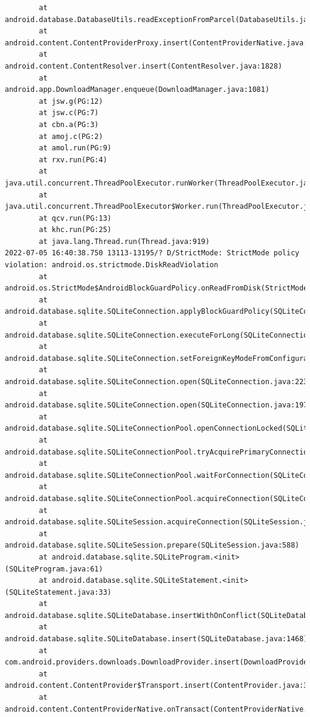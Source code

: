\documentclass[a4paper,12pt]{book}
\begin{document}
\begin{lstlisting}
        at android.database.DatabaseUtils.readExceptionFromParcel(DatabaseUtils.java:137)
        at android.content.ContentProviderProxy.insert(ContentProviderNative.java:481)
        at android.content.ContentResolver.insert(ContentResolver.java:1828)
        at android.app.DownloadManager.enqueue(DownloadManager.java:1081)
        at jsw.g(PG:12)
        at jsw.c(PG:7)
        at cbn.a(PG:3)
        at amoj.c(PG:2)
        at amol.run(PG:9)
        at rxv.run(PG:4)
        at java.util.concurrent.ThreadPoolExecutor.runWorker(ThreadPoolExecutor.java:1167)
        at java.util.concurrent.ThreadPoolExecutor$Worker.run(ThreadPoolExecutor.java:641)
        at qcv.run(PG:13)
        at khc.run(PG:25)
        at java.lang.Thread.run(Thread.java:919)
2022-07-05 16:40:38.750 13113-13195/? D/StrictMode: StrictMode policy violation: android.os.strictmode.DiskReadViolation
        at android.os.StrictMode$AndroidBlockGuardPolicy.onReadFromDisk(StrictMode.java:1571)
        at android.database.sqlite.SQLiteConnection.applyBlockGuardPolicy(SQLiteConnection.java:1138)
        at android.database.sqlite.SQLiteConnection.executeForLong(SQLiteConnection.java:688)
        at android.database.sqlite.SQLiteConnection.setForeignKeyModeFromConfiguration(SQLiteConnection.java:290)
        at android.database.sqlite.SQLiteConnection.open(SQLiteConnection.java:223)
        at android.database.sqlite.SQLiteConnection.open(SQLiteConnection.java:197)
        at android.database.sqlite.SQLiteConnectionPool.openConnectionLocked(SQLiteConnectionPool.java:505)
        at android.database.sqlite.SQLiteConnectionPool.tryAcquirePrimaryConnectionLocked(SQLiteConnectionPool.java:949)
        at android.database.sqlite.SQLiteConnectionPool.waitForConnection(SQLiteConnectionPool.java:699)
        at android.database.sqlite.SQLiteConnectionPool.acquireConnection(SQLiteConnectionPool.java:380)
        at android.database.sqlite.SQLiteSession.acquireConnection(SQLiteSession.java:896)
        at android.database.sqlite.SQLiteSession.prepare(SQLiteSession.java:588)
        at android.database.sqlite.SQLiteProgram.<init>(SQLiteProgram.java:61)
        at android.database.sqlite.SQLiteStatement.<init>(SQLiteStatement.java:33)
        at android.database.sqlite.SQLiteDatabase.insertWithOnConflict(SQLiteDatabase.java:1597)
        at android.database.sqlite.SQLiteDatabase.insert(SQLiteDatabase.java:1468)
        at com.android.providers.downloads.DownloadProvider.insert(DownloadProvider.java:972)
        at android.content.ContentProvider$Transport.insert(ContentProvider.java:309)
        at android.content.ContentProviderNative.onTransact(ContentProviderNative.java:154)

\end{lstlisting}
\end{document}
